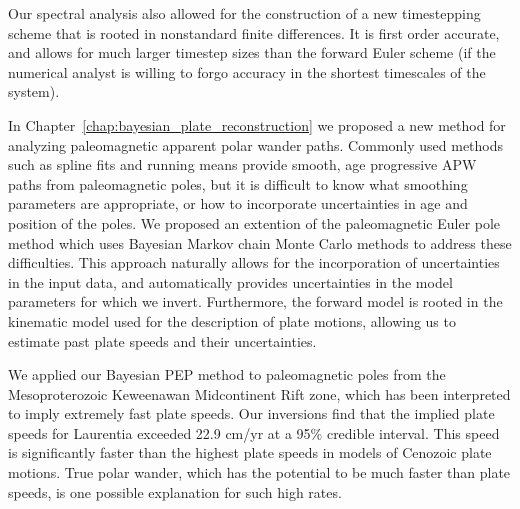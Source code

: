 Our spectral analysis also allowed for the construction of a new timestepping
scheme that is rooted in nonstandard finite differences. It is first order accurate,
and allows for much larger timestep sizes than the forward Euler scheme 
(if the numerical analyst is willing to forgo accuracy in the shortest timescales of the system).

In Chapter~\ref{chap:bayesian_plate_reconstruction} we proposed a new method
for analyzing paleomagnetic apparent polar wander paths. Commonly used methods
such as spline fits and running means provide smooth, age progressive APW paths
from paleomagnetic poles, but it is difficult to know what smoothing parameters
are appropriate, or how to incorporate uncertainties in age and position of the poles.
We proposed an extention of the paleomagnetic Euler pole method which uses Bayesian
Markov chain Monte Carlo methods to address these difficulties.
This approach naturally allows for the incorporation of uncertainties in the input data,
and automatically provides uncertainties in the model parameters for which we invert.
Furthermore, the forward model is rooted in the kinematic model used
for the description of plate motions, allowing us to estimate past plate speeds
and their uncertainties.

We applied our Bayesian PEP method to paleomagnetic poles from the 
Mesoproterozoic Keweenawan Midcontinent Rift zone, which has been interpreted to
imply extremely fast plate speeds. Our inversions find that the implied plate
speeds for Laurentia exceeded 22.9 cm/yr at a 95\% credible interval.
This speed is significantly faster than the highest plate speeds in
models of Cenozoic plate motions. True polar wander, which has the potential
to be much faster than plate speeds, is one possible explanation for such high rates.
